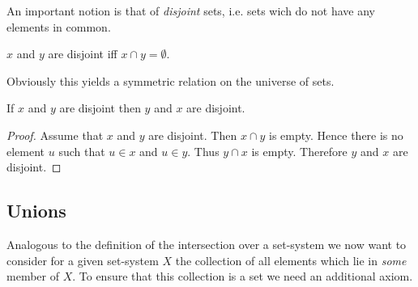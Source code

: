 \documentclass[../../set-theory.tex]{subfiles}
\begin{document}
  \noindent An important notion is that of \textit{disjoint} sets, i.e. sets
  wich do not have any elements in common.

  \begin{forthel}
    \begin{definition}
      $x$ and $y$ are disjoint iff $x \cap y = \emptyset$.
    \end{definition}
  \end{forthel}

  \noindent Obviously this yields a symmetric relation on the universe of sets.

  \begin{forthel}
    \begin{proposition}\label{SetTheory_01_01_300845}
      If $x$ and $y$ are disjoint then $y$ and $x$ are disjoint.
    \end{proposition}
    \begin{proof}
      Assume that $x$ and $y$ are disjoint.
      Then $x \cap y$ is empty.
      Hence there is no element $u$ such that $u \in x$ and $u \in y$.
      Thus $y \cap x$ is empty.
      Therefore $y$ and $x$ are disjoint.
    \end{proof}
  \end{forthel}


  \subsection{Unions}

  \noindent Analogous to the definition of the intersection over a set-system
  we now want to consider for a given set-system $X$ the collection of all
  elements which lie in \textit{some} member of $X$.
  To ensure that this collection is a set we need an additional axiom.
\end{document}
